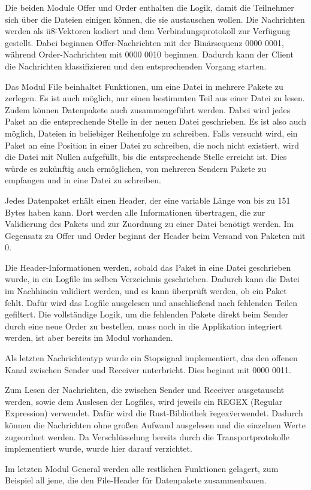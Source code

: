 Die beiden Module Offer und Order enthalten die Logik, damit die Teilnehmer sich über die Dateien einigen können, die sie austauschen wollen.
Die Nachrichten werden als \"u8\"-Vektoren kodiert und dem Verbindungsprotokoll zur Verfügung gestellt. Dabei beginnen Offer-Nachrichten mit der Binärsequenz 0000 0001, während Order-Nachrichten mit 0000 0010 beginnen.
Dadurch kann der Client die Nachrichten klassifizieren und den entsprechenden Vorgang starten.

Das Modul File beinhaltet Funktionen, um eine Datei in mehrere Pakete zu zerlegen. Es ist auch möglich, nur einen bestimmten Teil aus einer Datei zu lesen.
Zudem können Datenpakete auch zusammengeführt werden. Dabei wird jedes Paket an die entsprechende Stelle in der neuen Datei geschrieben. Es ist also auch möglich, Dateien in beliebiger Reihenfolge zu schreiben. Falls versucht wird, ein Paket an eine Position in einer Datei zu schreiben, die noch nicht existiert, wird die Datei mit Nullen aufgefüllt, bis die entsprechende Stelle erreicht ist.
Dies würde es zukünftig auch ermöglichen, von mehreren Sendern Pakete zu empfangen und in eine Datei zu schreiben.

Jedes Datenpaket erhält einen Header, der eine variable Länge von bis zu 151 Bytes haben kann. Dort werden alle Informationen übertragen, die zur Validierung des Pakets und zur Zuordnung zu einer Datei benötigt werden.
Im Gegensatz zu Offer und Order beginnt der Header beim Versand von Paketen mit 0.

Die Header-Informationen werden, sobald das Paket in eine Datei geschrieben wurde, in ein Logfile im selben Verzeichnis geschrieben. Dadurch kann die Datei im Nachhinein validiert werden, und es kann überprüft werden, ob ein Paket fehlt. Dafür wird das Logfile ausgelesen und anschließend nach fehlenden Teilen gefiltert.
Die vollständige Logik, um die fehlenden Pakete direkt beim Sender durch eine neue Order zu bestellen, muss noch in die Applikation integriert werden, ist aber bereits im Modul vorhanden.

Als letzten Nachrichtentyp wurde ein Stopsignal implementiert, das den offenen Kanal zwischen Sender und Receiver unterbricht. Dies beginnt mit 0000 0011.

Zum Lesen der Nachrichten, die zwischen Sender und Receiver ausgetauscht werden, sowie dem Auslesen der Logfiles, wird jeweils ein REGEX (Regular Expression) verwendet. Dafür wird die Rust-Bibliothek \"regex\" verwendet.
Dadurch können die Nachrichten ohne großen Aufwand ausgelesen und die einzelnen Werte zugeordnet werden.
Da Verschlüsselung bereits durch die Transportprotokolle implementiert wurde, wurde hier darauf verzichtet.

Im letzten Modul General werden alle restlichen Funktionen gelagert, zum Beispiel all jene, die den File-Header für Datenpakete zusammenbauen.
